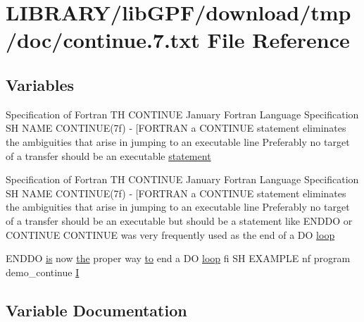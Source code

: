 \hypertarget{continue_87_8txt}{}\section{L\+I\+B\+R\+A\+R\+Y/lib\+G\+P\+F/download/tmp/doc/continue.7.txt File Reference}
\label{continue_87_8txt}
\subsection*{Variables}
\begin{DoxyCompactItemize}
\item 
Specification of Fortran TH C\+O\+N\+T\+I\+N\+UE January Fortran Language Specification SH N\+A\+ME C\+O\+N\+T\+I\+N\+UE(7f) -\/ \mbox{[}\+F\+O\+R\+T\+R\+A\+N a C\+O\+N\+T\+I\+N\+U\+E statement eliminates the ambiguities that arise in jumping to an executable line Preferably no target of a transfer should be an executable \hyperlink{continue_87_8txt_ab499dad98bb4e44fe84dabd1bf0fa987}{statement}
\item 
Specification of Fortran TH C\+O\+N\+T\+I\+N\+UE January Fortran Language Specification SH N\+A\+ME C\+O\+N\+T\+I\+N\+UE(7f) -\/ \mbox{[}\+F\+O\+R\+T\+R\+A\+N a C\+O\+N\+T\+I\+N\+U\+E statement eliminates the ambiguities that arise in jumping to an executable line Preferably no target of a transfer should be an executable but should be a statement like E\+N\+D\+D\+O or C\+O\+N\+T\+I\+N\+U\+E C\+O\+N\+T\+I\+N\+U\+E was very frequently used as the end of a DO \hyperlink{continue_87_8txt_a5094e6a64d1227c84a0bf4db8f6c3788}{loop}
\item 
E\+N\+D\+DO \hyperlink{intro__blas1_83_8txt_a42a91df93f840595de3019ceb5d1df23}{is} now \hyperlink{M__stopwatch_83_8txt_a0f266597de2e57eb3aa964927bb30e14}{the} proper way \hyperlink{M__stopwatch_83_8txt_a97209fd3e34ef701c0a9734280779cbb}{to} end a DO \hyperlink{continue_87_8txt_a5094e6a64d1227c84a0bf4db8f6c3788}{loop} fi SH E\+X\+A\+M\+P\+LE nf program demo\+\_\+continue \hyperlink{continue_87_8txt_ae7b8826453d28f1bdb2fba7e889eb23b}{I}
\end{DoxyCompactItemize}


\subsection{Variable Documentation}
\mbox{\label{continue_87_8txt_ae7b8826453d28f1bdb2fba7e889eb23b}} 
